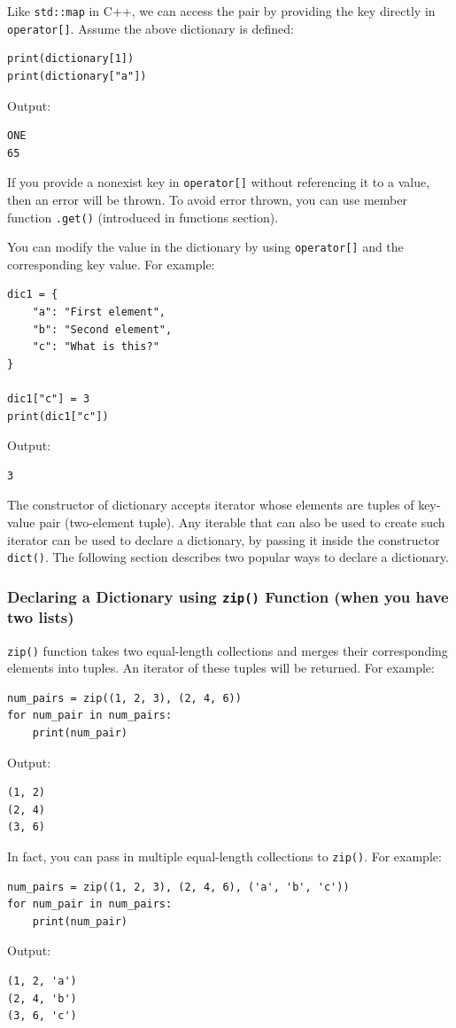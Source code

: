 \documentclass[12pt]{book}
\begin{document}
Like \texttt{std::map} in C++, we can access the pair by providing the key directly in \texttt{operator[]}. Assume the above dictionary is defined:
\begin{verbatim}
print(dictionary[1])
print(dictionary["a"])
\end{verbatim}
Output:
\begin{verbatim}
ONE
65
\end{verbatim}
If you provide a nonexist key in \texttt{operator[]} without referencing it to a value, then an error will be thrown. To avoid error thrown, you can use member function \texttt{.get()} (introduced in functions section).

You can modify the value in the dictionary by using \texttt{operator[]} and the corresponding key value. For example:
\begin{verbatim}
dic1 = {
    "a": "First element",
    "b": "Second element",
    "c": "What is this?"
}

dic1["c"] = 3
print(dic1["c"])
\end{verbatim}
Output:
\begin{verbatim}
3
\end{verbatim}

The constructor of dictionary accepts iterator whose elements are tuples of key-value pair (two-element tuple). Any iterable that can also be used to create such iterator can be used to declare a dictionary, by passing it inside the constructor \texttt{dict()}. The following section describes two popular ways to declare a dictionary.
\subsubsection{Declaring a Dictionary using \texttt{zip()} Function (when you have two lists)}
\label{sec:orgd3886c1}
\texttt{zip()} function takes two equal-length collections and merges their corresponding elements into tuples. An iterator of these tuples will be returned. For example:
\begin{verbatim}
num_pairs = zip((1, 2, 3), (2, 4, 6))
for num_pair in num_pairs:
    print(num_pair)
\end{verbatim}
Output:
\begin{verbatim}
(1, 2)
(2, 4)
(3, 6)
\end{verbatim}
In fact, you can pass in multiple equal-length collections to \texttt{zip()}. For example:
\begin{verbatim}
num_pairs = zip((1, 2, 3), (2, 4, 6), ('a', 'b', 'c'))
for num_pair in num_pairs:
    print(num_pair)
\end{verbatim}
Output:
\begin{verbatim}
(1, 2, 'a')
(2, 4, 'b')
(3, 6, 'c')
\end{verbatim}
\end{document}
